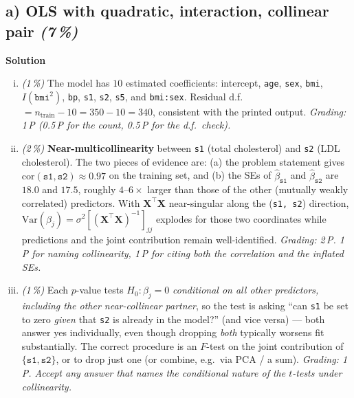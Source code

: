 \documentclass[11pt,a4paper]{article}
\newcommand{\subpoints}[1]{\textit{(#1\,\%)}}
\newcommand{\sol}{\noindent\textbf{Solution}}
\begin{document}
\subsection*{a) OLS with quadratic, interaction, collinear pair \subpoints{7}}
\sol{}
\begin{enumerate}[(i)]
  \item \subpoints{1} The model has $10$ estimated coefficients: intercept, \texttt{age},
        \texttt{sex}, \texttt{bmi}, $I(\texttt{bmi}^2)$, \texttt{bp}, \texttt{s1}, \texttt{s2},
        \texttt{s5}, and \texttt{bmi:sex}. Residual d.f.\ $= n_\text{train} - 10 = 350 - 10 = \boxed{340}$,
        consistent with the printed output.
        \emph{Grading: 1\,P (0.5\,P for the count, 0.5\,P for the d.f.\ check).}

  \item \subpoints{2} \textbf{Near-multicollinearity} between \texttt{s1} (total cholesterol) and
        \texttt{s2} (LDL cholesterol). The two pieces of evidence are: (a) the problem statement
        gives $\mathrm{cor}(\texttt{s1}, \texttt{s2}) \approx 0.97$ on the training set, and (b)
        the SEs of $\hat\beta_{\texttt{s1}}$ and $\hat\beta_{\texttt{s2}}$ are $18.0$ and $17.5$,
        roughly $4$--$6\times$ larger than those of the other (mutually weakly correlated)
        predictors. With $\mathbf{X}^\top \mathbf{X}$ near-singular along the (\texttt{s1, s2})
        direction, $\mathrm{Var}(\hat\beta_j) = \sigma^2 [(\mathbf{X}^\top \mathbf{X})^{-1}]_{jj}$
        explodes for those two coordinates while predictions and the joint contribution remain
        well-identified.
        \emph{Grading: 2\,P. 1\,P for naming collinearity, 1\,P for citing both the correlation and
        the inflated SEs.}

  \item \subpoints{1} Each $p$-value tests $H_0: \beta_j = 0$ \emph{conditional on all other
        predictors, including the other near-collinear partner}, so the test is asking ``can
        \texttt{s1} be set to zero \emph{given} that \texttt{s2} is already in the model?'' (and
        vice versa) --- both answer yes individually, even though dropping \emph{both} typically
        worsens fit substantially. The correct procedure is an $F$-test on the joint
        contribution of $\{\texttt{s1}, \texttt{s2}\}$, or to drop just one (or combine, e.g.\
        via PCA / a sum).
        \emph{Grading: 1\,P. Accept any answer that names the conditional nature of the $t$-tests
        under collinearity.}


\end{enumerate}
\end{document}
